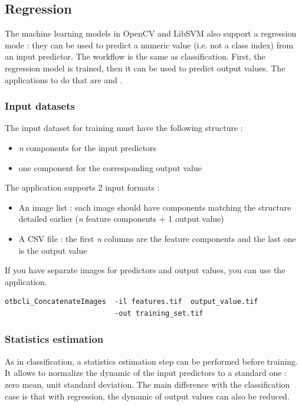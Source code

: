 \subsection{Regression}\label{ssec:regression}

The machine learning models in OpenCV and LibSVM also support a regression mode :
they can be used to predict a numeric value (i.e. not a class index) from an input
predictor. The workflow is the same as classification. First, the regression model
is trained, then it can be used to predict output values. The applications to do
that are  and .

\subsubsection{Input datasets}

The input dataset for training must have the following structure :
\begin{itemize}
\item \textit{n} components for the input predictors
\item one component for the corresponding output value
\end{itemize}

The  application supports 2 input formats :
\begin{itemize}
\item An image list : each image should have components matching the structure
detailed earlier (\textit{n} feature components + 1 output value)
\item A CSV file : the first \textit{n} columns are the feature components and
the last one is the output value
\end{itemize}

If you have separate images for predictors and output values, you can use the 
application.

\begin{verbatim}
otbcli_ConcatenateImages  -il features.tif  output_value.tif
                          -out training_set.tif
\end{verbatim}

\subsubsection{Statistics estimation}

As in classification, a statistics estimation step can be performed before
training. It allows to normalize the dynamic of the input predictors to a standard
one : zero mean, unit standard deviation. The main difference with the classification
case is that with regression, the dynamic of output values can also be reduced.

